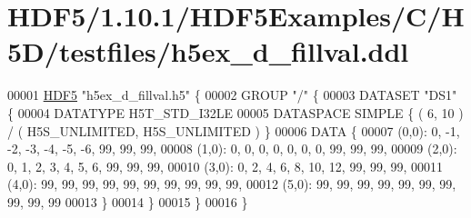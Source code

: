 \hypertarget{_h_d_f5_21_810_81_2_h_d_f5_examples_2_c_2_h5_d_2testfiles_2h5ex__d__fillval_8ddl_source}{}\section{H\+D\+F5/1.10.1/\+H\+D\+F5\+Examples/\+C/\+H5\+D/testfiles/h5ex\+\_\+d\+\_\+fillval.ddl}
\label{_h_d_f5_21_810_81_2_h_d_f5_examples_2_c_2_h5_d_2testfiles_2h5ex__d__fillval_8ddl_source}

\begin{DoxyCode}
00001 \hyperlink{namespace_h_d_f5}{HDF5} \textcolor{stringliteral}{"h5ex\_d\_fillval.h5"} \{
00002 GROUP \textcolor{stringliteral}{"/"} \{
00003    DATASET \textcolor{stringliteral}{"DS1"} \{
00004       DATATYPE  H5T\_STD\_I32LE
00005       DATASPACE  SIMPLE \{ ( 6, 10 ) / ( H5S\_UNLIMITED, H5S\_UNLIMITED ) \}
00006       DATA \{
00007       (0,0): 0, -1, -2, -3, -4, -5, -6, 99, 99, 99,
00008       (1,0): 0, 0, 0, 0, 0, 0, 0, 99, 99, 99,
00009       (2,0): 0, 1, 2, 3, 4, 5, 6, 99, 99, 99,
00010       (3,0): 0, 2, 4, 6, 8, 10, 12, 99, 99, 99,
00011       (4,0): 99, 99, 99, 99, 99, 99, 99, 99, 99, 99,
00012       (5,0): 99, 99, 99, 99, 99, 99, 99, 99, 99, 99
00013       \}
00014    \}
00015 \}
00016 \}
\end{DoxyCode}
